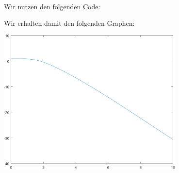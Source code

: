 \section{}

Wir nutzen den folgenden Code:



Wir erhalten damit den folgenden Graphen:

\begin{center}
  \includegraphics[width = 0.7\textwidth]{chapter_08/exercise_08_40_figure.pdf}
\end{center}
